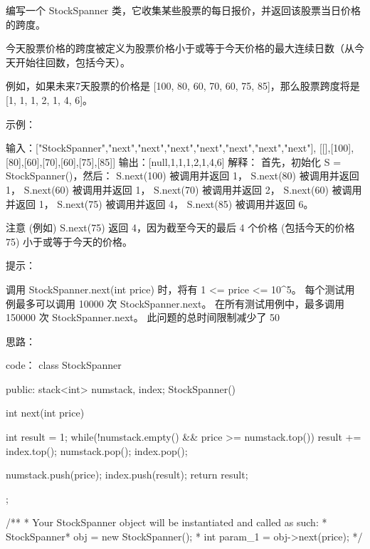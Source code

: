 编写一个 StockSpanner 类，它收集某些股票的每日报价，并返回该股票当日价格的跨度。

今天股票价格的跨度被定义为股票价格小于或等于今天价格的最大连续日数（从今天开始往回数，包括今天）。

例如，如果未来7天股票的价格是 [100, 80, 60, 70, 60, 75, 85]，那么股票跨度将是 [1, 1, 1, 2, 1, 4, 6]。

 

示例：

输入：["StockSpanner","next","next","next","next","next","next","next"], [[],[100],[80],[60],[70],[60],[75],[85]]
输出：[null,1,1,1,2,1,4,6]
解释：
首先，初始化 S = StockSpanner()，然后：
S.next(100) 被调用并返回 1，
S.next(80) 被调用并返回 1，
S.next(60) 被调用并返回 1，
S.next(70) 被调用并返回 2，
S.next(60) 被调用并返回 1，
S.next(75) 被调用并返回 4，
S.next(85) 被调用并返回 6。

注意 (例如) S.next(75) 返回 4，因为截至今天的最后 4 个价格
(包括今天的价格 75) 小于或等于今天的价格。

 

提示：

    调用 StockSpanner.next(int price) 时，将有 1 <= price <= 10^5。
    每个测试用例最多可以调用  10000 次 StockSpanner.next。
    在所有测试用例中，最多调用 150000 次 StockSpanner.next。
    此问题的总时间限制减少了 50%




















思路：























code：
class StockSpanner {
public:
    stack<int> numstack, index;
    StockSpanner() {
        
    }
    
    int next(int price) {
        int result = 1;
        while(!numstack.empty() && price >= numstack.top())
        {
            result += index.top();
            numstack.pop();
            index.pop();
        }
        
        numstack.push(price);
        index.push(result);
        return result;
    }
};

/**
 * Your StockSpanner object will be instantiated and called as such:
 * StockSpanner* obj = new StockSpanner();
 * int param_1 = obj->next(price);
 */